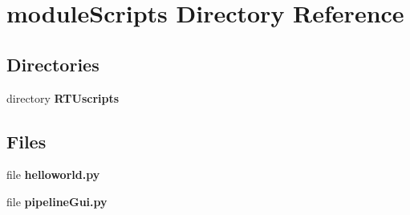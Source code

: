 \section{module\+Scripts Directory Reference}
\label{dir_50a38882319ba770cdfddee41fc9d7d6}
\subsection*{Directories}
\begin{DoxyCompactItemize}
\item 
directory {\bf R\+T\+Uscripts}
\end{DoxyCompactItemize}
\subsection*{Files}
\begin{DoxyCompactItemize}
\item 
file {\bf helloworld.\+py}
\item 
file {\bf pipeline\+Gui.\+py}
\end{DoxyCompactItemize}
